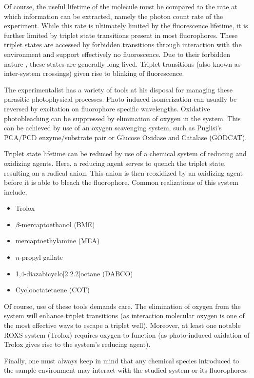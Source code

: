 \documentclass{article}
\newcommand{\refneeded}{\todo[color=green!20]{Referenced needed.}}
\begin{document}
Of course, the useful lifetime of the molecule must be compared to the
rate at which information can be extracted, namely the photon count
rate of the experiment. While this rate is ultimately limited by the
fluorescence lifetime, it is further limited by triplet state transitions
present in most fluorophores. These triplet states are accessed by
forbidden transitions through
interaction with the environment and support effectively no
fluoroscence. Due to their forbidden nature , these states are
generally long-lived. Triplet transitions (also known as inter-system
crossings) given rise to blinking of fluorescence.

The experimentalist has a variety of tools at his disposal for managing
these parasitic photophysical processes. Photo-induced isomerization
can usually be reversed by excitation on fluorophore specific
wavelengths\cite{Fan2011}. Oxidative photobleaching can be suppressed
by elimination of oxygen in the system. This can be achieved by use of
an oxygen scavenging system, such as Puglisi's PCA/PCD
enzyme/substrate pair\cite{Aitkin2008} or Glucose Oxidase and Catalase
(GODCAT)\refneeded.

Triplet state lifetime can be reduced by use of a chemical system of
reducing and oxidizing agents\cite{Vogelsang2008}. Here, a reducing
agent serves to quench the triplet state, resulting an a radical
anion. This anion is then reoxidized by an oxidizing agent before it
is able to bleach the fluorophore. Common realizations of this system
include\cite{Dave2009},
\begin{itemize}
\item Trolox\cite{Rasnik2006}
\item $\beta$-mercaptoethanol (BME)
\item mercaptoethylamine (MEA)
\item $n$-propyl gallate
\item 1,4-diazabicyclo[2.2.2]octane (DABCO)
\item Cyclooctatetaene (COT)
\end{itemize}

Of course, use of these tools demands care. The elimination of oxygen
from the system will enhance triplet transitions (as interaction
molecular oxygen is one of the most effective ways to escape a triplet
well\cite{Campos2011}). Moreover, at least one notable ROXS system
(Trolox) requires oxygen to function (as photo-induced oxidation of
Trolox gives rise to the system's reducing agent\cite{Cordes2009}).

Finally, one must always keep in mind that any chemical species
introduced to the sample environment may interact with the studied
system or its fluorophores.
\end{document}
